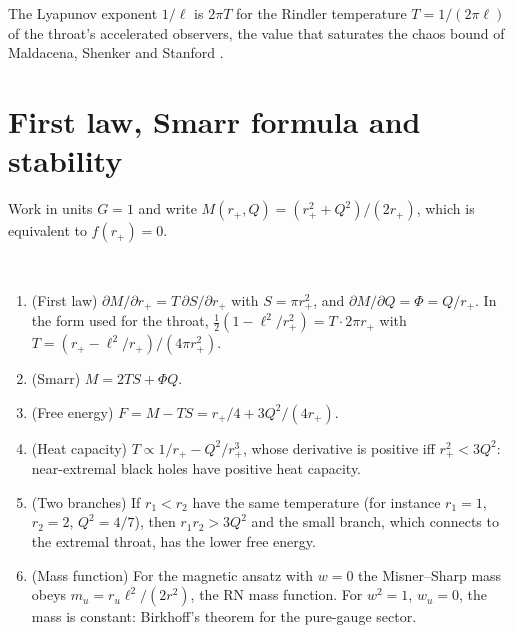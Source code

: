 The Lyapunov exponent $1/\ell$ is $2\pi T$ for the Rindler temperature $T=1/(2\pi\ell)$ of the throat's accelerated observers, the value that saturates the chaos bound of Maldacena, Shenker and Stanford \cite{MSS2016}.

\section{First law, Smarr formula and stability}

Work in units $G=1$ and write $M(r_+,Q)=(r_+^2+Q^2)/(2r_+)$, which is equivalent to $f(r_+)=0$.

\begin{theorem}\label{thm:rnlaws}\ver\
\begin{enumerate}[label=(\roman*)]
\item (First law) $\partial M/\partial r_+=T\,\partial S/\partial r_+$ with $S=\pi r_+^2$, and $\partial M/\partial Q=\Phi=Q/r_+$. In the form used for the throat, $\frac12(1-\ell^2/r_+^2)=T\cdot2\pi r_+$ with $T=(r_+-\ell^2/r_+)/(4\pi r_+^2)$.
\item (Smarr) $M=2TS+\Phi Q$.
\item (Free energy) $F=M-TS=r_+/4+3Q^2/(4r_+)$.
\item (Heat capacity) $T\propto1/r_+-Q^2/r_+^3$, whose derivative is positive iff $r_+^2<3Q^2$: near-extremal black holes have positive heat capacity.
\item (Two branches) If $r_1<r_2$ have the same temperature (for instance $r_1=1$, $r_2=2$, $Q^2=4/7$), then $r_1r_2>3Q^2$ and the small branch, which connects to the extremal throat, has the lower free energy.
\item (Mass function) For the magnetic ansatz with $w=0$ the Misner--Sharp mass obeys $m_u=r_u\ell^2/(2r^2)$, the RN mass function. For $w^2=1$, $w_u=0$, the mass is constant: Birkhoff's theorem for the pure-gauge sector.
\end{enumerate}
\end{theorem}
